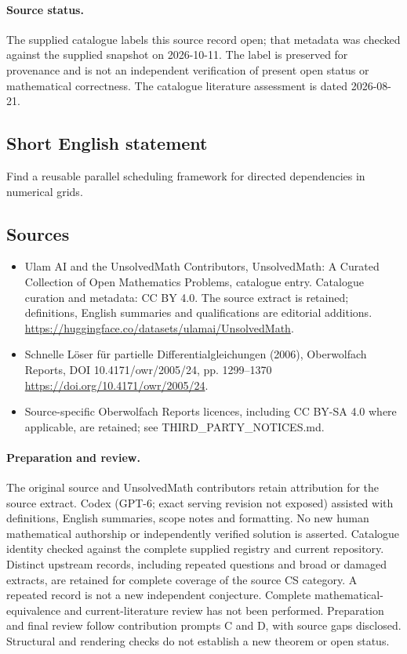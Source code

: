 \documentclass[11pt]{article}
\begin{document}
\paragraph{Source status.}
The supplied catalogue labels this source record open; that metadata was checked against the supplied snapshot on 2026-10-11. The label is preserved for provenance and is not an independent verification of present open status or mathematical correctness. The catalogue literature assessment is dated 2026-08-21.
\subsection{Short English statement}
Find a reusable parallel scheduling framework for directed dependencies in numerical grids.
\subsection{Sources}
\begin{itemize}
\item[S1] Ulam AI and the UnsolvedMath Contributors, UnsolvedMath: A Curated Collection of Open Mathematics Problems, catalogue entry. Catalogue curation and metadata: CC BY 4.0. The source extract is retained; definitions, English summaries and qualifications are editorial additions.
\url{https://huggingface.co/datasets/ulamai/UnsolvedMath}.
\item[S2] Schnelle Löser für partielle Differentialgleichungen (2006), Oberwolfach Reports, DOI 10.4171/owr/2005/24, pp. 1299--1370
\url{https://doi.org/10.4171/owr/2005/24}.
\item Source-specific Oberwolfach Reports licences, including CC BY-SA 4.0 where applicable, are retained; see THIRD\_PARTY\_NOTICES.md.
\end{itemize}
\paragraph{Preparation and review.}
The original source and UnsolvedMath contributors retain attribution for the source extract. Codex (GPT-6; exact serving revision not exposed) assisted with definitions, English summaries, scope notes and formatting. No new human mathematical authorship or independently verified solution is asserted. Catalogue identity checked against the complete supplied registry and current repository. Distinct upstream records, including repeated questions and broad or damaged extracts, are retained for complete coverage of the source CS category. A repeated record is not a new independent conjecture. Complete mathematical-equivalence and current-literature review has not been performed. Preparation and final review follow contribution prompts C and D, with source gaps disclosed. Structural and rendering checks do not establish a new theorem or open status.
\label{end:statement}
\end{document}
